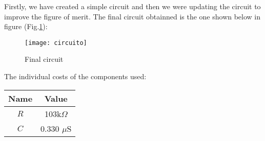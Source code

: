 Firstly, we have created a simple circuit and then we were updating the circuit to improve the figure of merit. The final circuit obtainned is the one shown below in figure (Fig.\ref{fig:circuito}): \par

\begin{figure}[H]
\centering
\texttt{[image: circuito]}
\caption{Final circuit}
\label{fig:circuito}
\end{figure}

The individual costs of the components used: 

\begin{center}
  \begin{tabular}{ | c | c | }
    \hline    
    {\bf Name} & {\bf Value} \\ \hline
    $R$ & 103k$\Omega$ \\ \hline 
    $C$ & 0.330 $\mu$S \\ 
    \hline
  \end{tabular}
\end{center}



